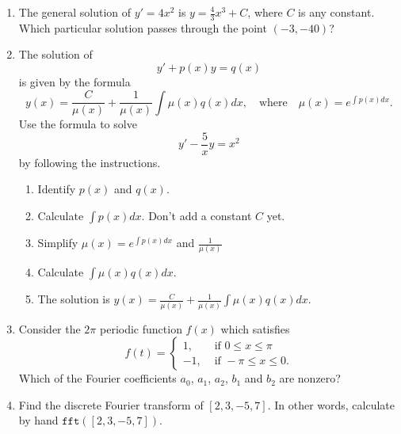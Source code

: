 \documentclass[12pt]{article}
\newcommand{\ratkaisu}[1]{{\color{blue}\quad\textrm{Solution } #1}}
\renewcommand{\ratkaisu}[1]{}
\begin{document}
\begin{enumerate}
\item The general solution of $y'=4x^2$ is $y=\frac{4}{3}x^3+C$, where $C$ is any constant. Which particular solution passes through the point $(-3,-40)$?
\ratkaisu{We have $y(x)=y=\frac{4}{3}x^3+C.$ Set $x=-3$ and $y(-3)=-30$ to obtain
$$
-30=\frac{4}{3}(-3)^3+C,
$$
that is
$$
-30=-36+C.
$$
We have $C=6$. The desired solution is $y(x)=y=\frac{4}{3}x^3+6$.
}
\item The solution of
$$
y'+p(x)y=q(x)
$$
is given by the formula
$$
y(x)=\frac{C}{\mu(x)}+\frac{1}{\mu(x)}\int \mu(x)q(x)dx,\quad\textrm{where}\quad
\mu(x)=e^{\int p(x)dx}.
$$
Use the formula to solve
$$
y'-\frac{5}{x}y=x^2
$$
by following the instructions.
\begin{enumerate}
\item Identify $p(x)$ and $q(x)$.\ratkaisu{$p(x)=-\frac{5}{x}$ and $q(x)=x^2$}
\item Calculate $\int p(x)dx$. Don't add a constant $C$ yet.\ratkaisu{$\int p(x)dx=-5\ln(x)$}
\item Simplify $\mu(x)=e^{\int p(x)dx}$ and $\frac{1}{\mu(x)}$\ratkaisu{$\mu(x)=\frac{1}{x^5}$ and $\frac{1}{\mu(x)}=x^5$}
\item Calculate $\int \mu(x)q(x)dx$.
\ratkaisu{$-\frac{1}{2x^2}$}
\item The solution is $y(x)=\frac{C}{\mu(x)}+\frac{1}{\mu(x)}\int \mu(x)q(x)dx$.
\ratkaisu{$y(x)=Cx^5-\frac12 x^3$}
\end{enumerate}

\item Consider the $2\pi$ periodic function $f(x)$ which satisfies
$$
f(t)
=\begin{cases}
1,&\textrm{ if }0\leq x\leq \pi\\
-1,&\textrm{ if }-\pi\leq x\leq 0.
\end{cases}
$$
Which of the Fourier coefficients $a_0$, $a_1$, $a_2$, $b_1$ and $b_2$ are nonzero?\ratkaisu{Because $f(-x)=-f(x)$, the function $f$ is odd and the list of formulas gives
$$
f(x)
=\sum_{n=1}^\infty b_n\sin(nx),
\quad\textrm{where}\quad
b_n=\frac{2}{\pi}\int_{0}^{\pi}
f(x)\sin(nx)dx
$$
Therefore, $a_0=a_1=a_2=0$. Moreover,
$$
b_1=\frac{2}{\pi}\int_{0}^{\pi}
\sin(x)dx
=\frac{2}{\pi}(\cos(0)-\cos(\pi))=\frac{4}{\pi},
$$
which is nonzero. Moreover,
$$
b_2=\frac{2}{\pi}\int_{0}^{\pi}
\sin(2x)dx
=\frac{2}{\pi}\frac{1}{2}(\cos(2\cdot 0)-\cos(2\cdot \pi))=0.
$$
}

\item Find the discrete Fourier transform of $[2,3,-5,7]$. In other words, calculate by hand $\texttt{fft}([2,3,-5,7])$.
\ratkaisu{$\texttt{fft}([2,3])=[7,7+4i,-13,7-4i]$}
\end{enumerate}
\end{document}
